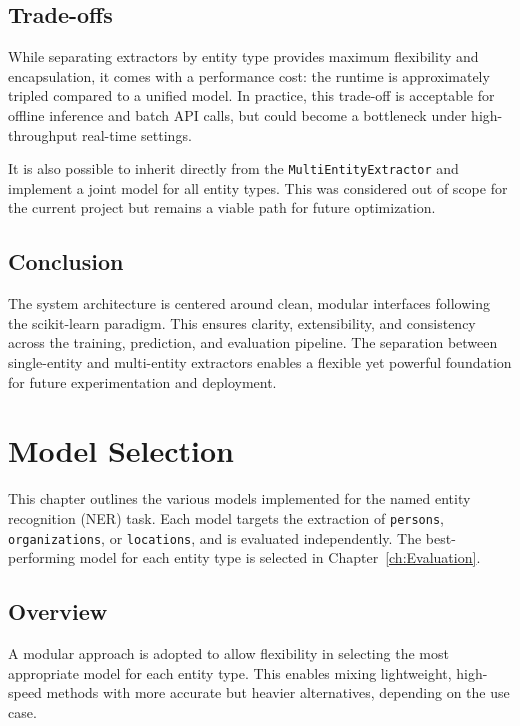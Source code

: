 \section{Trade-offs}

While separating extractors by entity type provides maximum flexibility and encapsulation, it comes with a performance cost: the runtime is approximately tripled compared to a unified model. In practice, this trade-off is acceptable for offline inference and batch API calls, but could become a bottleneck under high-throughput real-time settings.

It is also possible to inherit directly from the \texttt{MultiEntityExtractor} and implement a joint model for all entity types. This was considered out of scope for the current project but remains a viable path for future optimization.

\section{Conclusion}

The system architecture is centered around clean, modular interfaces following the scikit-learn paradigm. This ensures clarity, extensibility, and consistency across the training, prediction, and evaluation pipeline. The separation between single-entity and multi-entity extractors enables a flexible yet powerful foundation for future experimentation and deployment.

\chapter{Model Selection}
\label{ch:Model-Selection}

This chapter outlines the various models implemented for the named entity recognition (NER) task. Each model targets the extraction of \texttt{persons}, \texttt{organizations}, or \texttt{locations}, and is evaluated independently. The best-performing model for each entity type is selected in Chapter~\ref{ch:Evaluation}.

\section{Overview}

A modular approach is adopted to allow flexibility in selecting the most appropriate model for each entity type. This enables mixing lightweight, high-speed methods with more accurate but heavier alternatives, depending on the use case.

